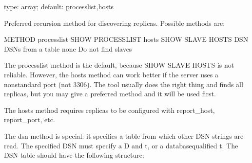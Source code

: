 \documentclass[letterpaper,10pt,english]{sphinxmanual}
\begin{document}
\begin{fulllineitems}
\label{\detokenize{mariadb-schema-change:cmdoption-mariadb-schema-change-recursion-method}}
\sphinxAtStartPar
type: array; default: processlist,hosts

\sphinxAtStartPar
Preferred recursion method for discovering replicas.  Possible methods are:

\begin{sphinxVerbatim}[commandchars=\\\{\}]
METHOD       
  
processlist  SHOW PROCESSLIST
hosts        SHOW SLAVE HOSTS
DSN      DSNs from a table
none         Do not find slaves
\end{sphinxVerbatim}

\sphinxAtStartPar
The processlist method is the default, because SHOW SLAVE HOSTS is not
reliable.  However, the hosts method can work better if the server uses a
non\sphinxhyphen{}standard port (not 3306).  The tool usually does the right thing and
finds all replicas, but you may give a preferred method and it will be used
first.

\sphinxAtStartPar
The hosts method requires replicas to be configured with report\_host,
report\_port, etc.

\sphinxAtStartPar
The dsn method is special: it specifies a table from which other DSN strings
are read.  The specified DSN must specify a D and t, or a database\sphinxhyphen{}qualified
t.  The DSN table should have the following structure:

\begin{sphinxVerbatim}[commandchars=\\\{\}]
   
      
     
     
    
\end{sphinxVerbatim}


\end{fulllineitems}
\end{document}
